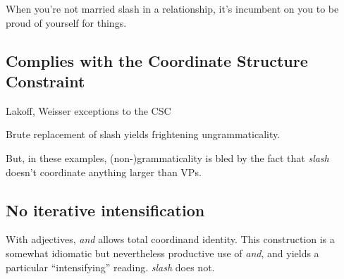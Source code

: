 \documentclass[charis,linguex,biblatex]{glossa}
\begin{document}
\begin{exe}
	\ex When you're not married slash in a relationship, it's incumbent on you to be proud of yourself for things. 
\end{exe}




\subsection{Complies with the Coordinate Structure Constraint}

Lakoff, Weisser exceptions to the CSC

Brute replacement of slash yields frightening ungrammaticality.

\begin{exe}
\ex	\begin{xlista}
	\end{xlista}	
\ex	\begin{xlista}
	\end{xlista}	
\end{exe}
		
But, in these examples, (non-)grammaticality is bled by the fact that \textit{slash} doesn't coordinate anything larger than VPs.		


\subsection{No iterative intensification}

With adjectives, \textit{and} allows total coordinand identity. This construction is a somewhat idiomatic but nevertheless productive use of \textit{and}, and yields a particular ``intensifying'' reading. \citep{Gleitman:1965} \textit{slash} does not. 

\begin{exe}
\ex \begin{xlista}
\end{xlista}
\end{exe}
\end{document}
